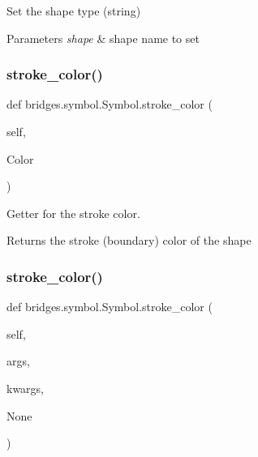 Set the shape type (string) 


\begin{DoxyParams}{Parameters}
{\em shape} & shape name to set \\
\hline
\end{DoxyParams}
\mbox{\label{classbridges_1_1symbol_1_1_symbol_ab7aef566eaf9624f6adc0ae1d5768b5b}} 
\subsubsection{\texorpdfstring{stroke\+\_\+color()}{stroke\_color()}\hspace{0.1cm}{\footnotesize\ttfamily [1/2]}}
{\footnotesize\ttfamily def bridges.\+symbol.\+Symbol.\+stroke\+\_\+color (\begin{DoxyParamCaption}\item[{}]{self,  }\item[{}]{Color }\end{DoxyParamCaption})}



Getter for the stroke color. 

\begin{DoxyReturn}{Returns}
the stroke (boundary) color of the shape 
\end{DoxyReturn}
\mbox{\label{classbridges_1_1symbol_1_1_symbol_a4b90f8a3ebbf1bd8586d970e796a2401}} 
\subsubsection{\texorpdfstring{stroke\+\_\+color()}{stroke\_color()}\hspace{0.1cm}{\footnotesize\ttfamily [2/2]}}
{\footnotesize\ttfamily def bridges.\+symbol.\+Symbol.\+stroke\+\_\+color (\begin{DoxyParamCaption}\item[{}]{self,  }\item[{}]{args,  }\item[{}]{kwargs,  }\item[{}]{None }\end{DoxyParamCaption})}



